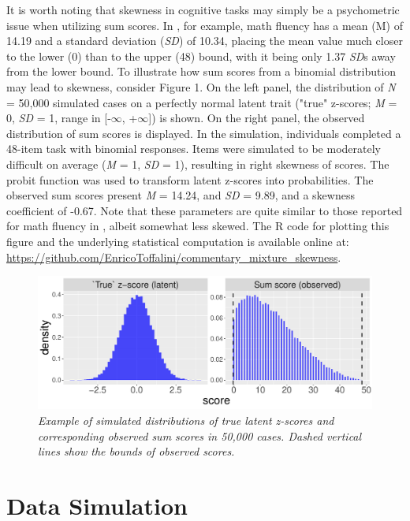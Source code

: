 \documentclass[letterpaper,11pt]{article}
\begin{document}
It is worth noting that skewness in cognitive tasks may simply be a psychometric issue when utilizing sum scores. In , for example, math fluency has a mean (M) of 14.19 and a standard deviation (\textit{SD}) of 10.34, placing the mean value much closer to the lower (0) than to the upper (48) bound, with it being only 1.37 \textit{SD}s away from the lower bound. To illustrate how sum scores from a binomial distribution may lead to skewness, consider Figure 1. On the left panel, the distribution of \textit{N} = 50,000 simulated cases on a perfectly normal latent trait ("true" z-scores; \textit{M} = 0, \textit{SD} = 1, range in [-$\infty$, +$\infty$]) is shown. On the right panel, the observed distribution of sum scores is displayed. In the simulation, individuals completed a 48-item task with binomial responses. Items were simulated to be moderately difficult on average (\textit{M} = 1, \textit{SD} = 1), resulting in right skewness of scores. The probit function was used to transform latent z-scores into probabilities. The observed sum scores present \textit{M} = 14.24, and \textit{SD} = 9.89, and a skewness coefficient of -0.67. Note that these parameters are quite similar to those reported for math fluency in , albeit somewhat less skewed. The R code for plotting this figure and the underlying statistical computation is available online at: \url{https://github.com/EnricoToffalini/commentary_mixture_skewness}. 

\begin{figure}[htbp]
	\label{fig:example}
	\caption{\newline \textit{Example of simulated distributions of true latent z-scores and corresponding observed sum scores in 50,000 cases. Dashed vertical lines show the bounds of observed scores.}}
	\centering
	\includegraphics[width=\textwidth]{../R code simulations/z-vs-sumscore.pdf}
\end{figure}

\section*{Data Simulation}
\end{document}
